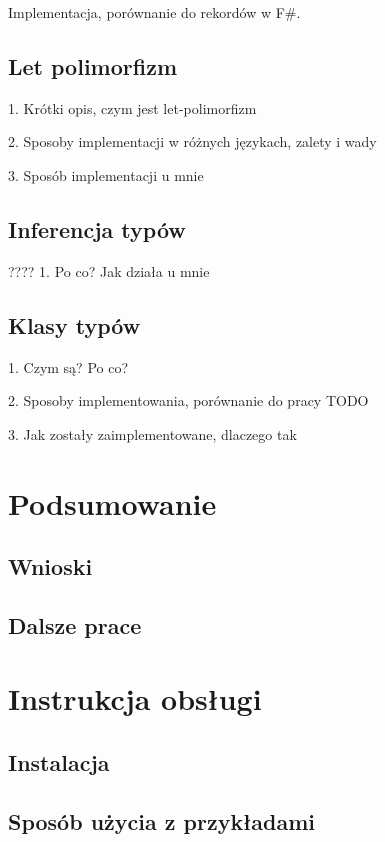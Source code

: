 \documentclass[declaration,shortabstract]{iithesis}
\begin{document}
Implementacja, porównanie do rekordów w F\#.

\section{Let polimorfizm}

1. Krótki opis, czym jest let-polimorfizm

2. Sposoby implementacji w różnych językach, zalety i wady 

3. Sposób implementacji u mnie

\section{Inferencja typów}
????
1. Po co? Jak działa u mnie

\section{Klasy typów}

1. Czym są? Po co? 

2. Sposoby implementowania, porównanie do pracy TODO

3. Jak zostały zaimplementowane, dlaczego tak

\chapter{Podsumowanie}

\section{Wnioski}

\section{Dalsze prace}

\chapter{Instrukcja obsługi}

\section{Instalacja}

\section{Sposób użycia z przykładami}
\end{document}
